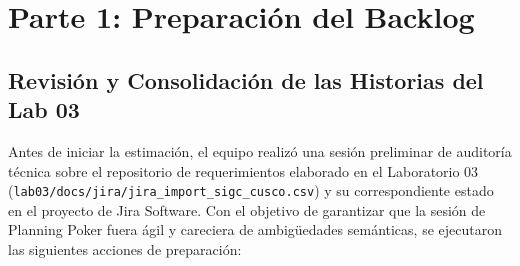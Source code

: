 \section{Parte 1: Preparación del Backlog}

\subsection{Revisión y Consolidación de las Historias del Lab 03}

Antes de iniciar la estimación, el equipo realizó una sesión preliminar de auditoría técnica sobre el repositorio de requerimientos elaborado en el Laboratorio 03 (\texttt{lab03/docs/jira/jira\_import\_sigc\_cusco.csv}) y su correspondiente estado en el proyecto de Jira Software. Con el objetivo de garantizar que la sesión de Planning Poker fuera ágil y careciera de ambigüedades semánticas, se ejecutaron las siguientes acciones de preparación:

